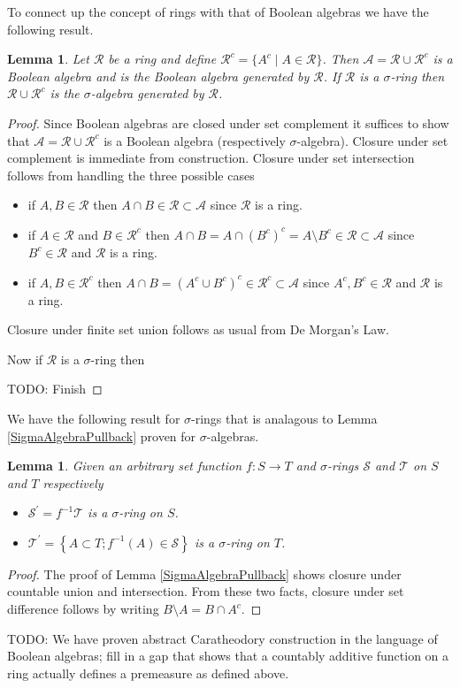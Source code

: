 \documentclass{amsart}
\newtheorem{lem}[thm]{Lemma}
\theoremstyle{remark}
\theoremstyle{definition}
\begin{document}
To connect up the concept of rings with that of Boolean algebras we
have the following result.
\begin{lem}Let $\mathcal{R}$ be a ring and define $\mathcal{R}^c =
  \lbrace A^c \mid A \in \mathcal{R}\rbrace$.  Then $\mathcal{A} =
  \mathcal{R} \cup \mathcal{R}^c$ is a Boolean algebra and is the
  Boolean algebra generated by $\mathcal{R}$.  If $\mathcal{R}$ is a
  $\sigma$-ring then $\mathcal{R} \cup \mathcal{R}^c$ is the
  $\sigma$-algebra generated by $\mathcal{R}$.
\end{lem}
\begin{proof}Since Boolean algebras are closed under set complement it
  suffices to show that $\mathcal{A} = \mathcal{R} \cup \mathcal{R}^c$ is a Boolean
  algebra (respectively $\sigma$-algebra).  Closure under set
  complement is immediate from construction.  Closure under set
  intersection follows from handling the three possible cases
\begin{itemize}
\item[(i)]if $A, B \in \mathcal{R}$ then $A\cap B \in \mathcal{R}
  \subset \mathcal{A}$ since $\mathcal{R}$ is a ring.
\item[(ii)]if $A \in \mathcal{R}$ and $B \in \mathcal{R}^c$ then
  $A\cap B = A \cap (B^c)^c = A \setminus B^c \in \mathcal{R}
  \subset \mathcal{A}$ since $B^c \in \mathcal{R}$ and $\mathcal{R}$ is a ring.
\item[(iii)]if $A, B \in \mathcal{R}^c$ then $A \cap B = (A^c \cup
  B^c)^c \in \mathcal{R}^c
  \subset \mathcal{A}$ since $A^c, B^c \in \mathcal{R}$ and $\mathcal{R}$ is a ring.
\end{itemize}
Closure under finite set union follows as usual from De Morgan's Law.

Now if $\mathcal{R}$ is a $\sigma$-ring then 

TODO: Finish
\end{proof}

We have the following result for $\sigma$-rings that is analagous to
Lemma \ref{SigmaAlgebraPullback} proven for $\sigma$-algebras.
\begin{lem}\label{SigmaRingPullback}Given an arbitrary set function $f
  : S \to T$ and $\sigma$-rings $\mathcal{S}$ and $\mathcal{T}$ on
  $S$ and $T$ respectively 
\begin{itemize}
\item[(i)] $\mathcal{S}^\prime = f^{-1} \mathcal{T}$ is a
  $\sigma$-ring on $S$.
\item[(ii)] $\mathcal{T}^\prime = \left \{A \subset T ; f^{-1}(A) \in
      \mathcal{S} \right \}$ is a $\sigma$-ring on $T$.
\end{itemize}
\end{lem}
\begin{proof}
The proof of Lemma \ref{SigmaAlgebraPullback} shows closure under
countable union and intersection.  From these two facts, closure under
set difference follows by writing $B \setminus A = B \cap A^c$.
\end{proof}
 TODO: We have proven abstract Caratheodory construction in the
language of Boolean algebras; fill in a gap that shows that a
countably additive function on a ring actually defines a premeasure as
defined above.
\end{document}
